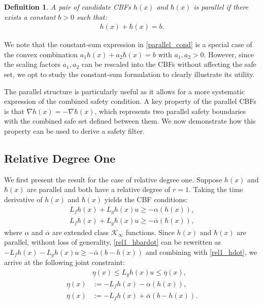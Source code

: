 \documentclass[letterpaper, 10 pt, conference]{ieeeconf}
\newtheorem{definition}{Definition}
\begin{document}
\begin{definition}
    A pair of candidate CBFs $h(x)$ and $\hbar(x)$ is \textit{parallel} if there exists a constant $b > 0$ such that:
    \begin{align}
        h(x) + \hbar(x) = b\label{parallel_cond}.
    \end{align}
\end{definition}

We note that the constant-sum expression in \eqref{parallel_cond} is a special case of the convex combination $a_1 h(x) + a_2 \hbar(x) = b$ with $a_1, a_2 > 0$. However, since the scaling factors $a_1, a_2$ can be rescaled into the CBFs without affecting the safe set, we opt to study the constant-sum formulation to clearly illustrate its utility.

The parallel structure is particularly useful as it allows for a more systematic expression of the combined safety condition. A key property of the parallel CBFs is that $\nabla h(x) = -\nabla \hbar(x)$, which represents two parallel safety boundaries with the combined safe set defined between them. We now demonstrate how this property can be used to derive a safety filter. 

\subsection{Relative Degree One}
We first present the result for the case of relative degree one. Suppose $h(x)$ and $\hbar(x)$ are parallel and both have a relative degree of $r = 1$. Taking the time derivative of $h(x)$ and $\hbar(x)$ yields the CBF conditions:
\begin{align}
    L_fh(x) + L_gh(x)u \geq -\alpha(h(x)),\label{rel1_hdot}\\
    L_f\hbar(x) + L_g\hbar(x)u \geq -\overline{\alpha}(\hbar(x))\label{rel1_hbardot},
\end{align}
where $\alpha$ and $\overline{\alpha}$ are extended class $\mathcal{K}_\infty$ functions. Since $h(x)$ and $\hbar(x)$ are parallel, without loss of generality, \eqref{rel1_hbardot} can be rewritten as $-L_fh(x) - L_gh(x)u \geq -\overline{\alpha}(b-h(x))$ and combining with \eqref{rel1_hdot}, we arrive at the following joint constraint:
\begin{align}\label{constraint}
 &   {\underline{\eta}(x)} 
    \leq L_gh(x)u \leq
   {\overline{\eta}(x)},
    \\
    \label{constraint1}
   \underline{\eta}(x) &:= -L_fh(x) -\alpha(h(x)) ,
   \\
   \overline{\eta}(x) &:= -L_fh(x) + \overline{\alpha}(b-h(x)).
    \label{constraint2}
\end{align}
\end{document}
